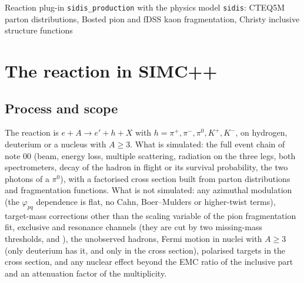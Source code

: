 \documentclass{simcnote}
\begin{document}
%
  {Reaction plug-in \texttt{sidis\_production} with the physics model \texttt{sidis}: CTEQ5M parton distributions,
   Bosted pion and fDSS kaon fragmentation, Christy inclusive structure functions}
\simcnotemaketitle
{}
\simcnotetoc

\section{The reaction in SIMC++}

\subsection{Process and scope}
The reaction is $e + A \to e' + h + X$ with $h=\pi^+,\pi^-,\pi^0,K^+,K^-$, on hydrogen, deuterium or a nucleus with
$A\ge3$. What is simulated: the full event chain of note 00 (beam, energy loss, multiple scattering, radiation on the three
legs, both spectrometers, decay of the hadron in flight or its survival probability, the two photons of a $\pi^0$), with a
factorised cross section built from parton distributions and fragmentation functions. What is not simulated: any
azimuthal modulation (the $\varphi_{pq}$ dependence is flat, no Cahn, Boer--Mulders or higher-twist terms), target-mass
corrections other than the scaling variable of the pion fragmentation fit, exclusive and resonance channels (they are
cut by two missing-mass thresholds,  and ), the unobserved hadrons, Fermi motion in
nuclei with $A\ge3$ (only deuterium has it, and only in the cross section), polarised targets in the cross section, and
any nuclear effect beyond the EMC ratio of the inclusive part and an attenuation factor of the multiplicity.
\end{document}
